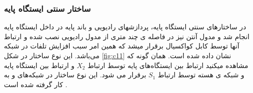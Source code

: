 \subsubsection{ساختار سنتی ایستگاه پایه }

در ساختارهای سنتی ایستگاه پایه، پردازشهای رادیویی و باند پایه در
داخل ایستگاه پایه انجام ‌شد و مدول آنتن نیز در فاصله
ی چند متری از مدول رادیویی نصب شده و ارتباط آنها
توسط کابل کواکسیال برقرار میشد که همین امر سبب
افزایش تلفات در شبکه می‌باشد. این نوع ساختار در شکل
\ref{fig:c11} نشان داده شده است. همان گونه که مشاهده میکنید
ارتباط بین ایستگاه‌های پایه توسط ارتباط  $X_2$ و ارتباط بین
ایستگاه پایه و شبکه ی هسته توسط ارتباط $ S_1$ برقرار می
شود. این نوع ساختار در شبکه‌های  و  به کار گرفته
شده است 
\cite{checko2015cloud}.

